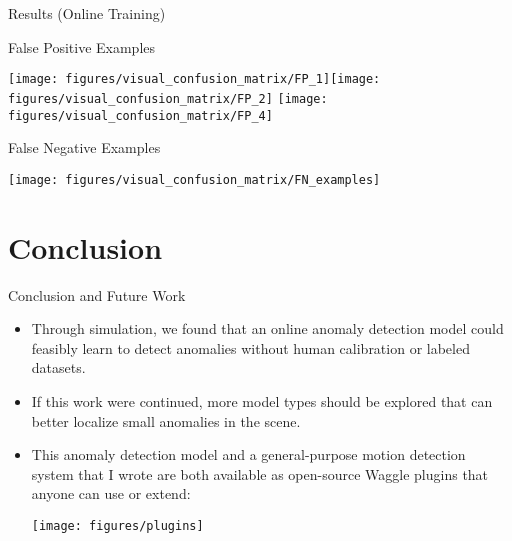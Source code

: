 \documentclass[10pt,handout]{beamer}
\begin{document}
\begin{frame}{Results (Online Training)}

\begin{exampleblock}{False Positive Examples}

\texttt{[image: figures/visual\_confusion\_matrix/FP\_1]}\texttt{[image: figures/visual\_confusion\_matrix/FP\_2]} \texttt{[image: figures/visual\_confusion\_matrix/FP\_4]}

\end{exampleblock}

\begin{exampleblock}{False Negative Examples}

\texttt{[image: figures/visual\_confusion\_matrix/FN\_examples]}

\end{exampleblock}

\end{frame}

\section{Conclusion}
\begin{frame}{Conclusion and Future Work}
\begin{itemize}

\item Through simulation, we found that an online anomaly detection model could feasibly learn to detect anomalies without human calibration or labeled datasets.\\[2mm]

\item If this work were continued, more model types should be explored that can better localize small anomalies in the scene.\\[2mm]

\item This anomaly detection model and a general-purpose motion detection system that I wrote are both available as open-source Waggle plugins that anyone can use or extend:\\[4mm]

\begin{center}
\texttt{[image: figures/plugins]}
\end{center}

\end{itemize}
\end{frame}
\end{document}
